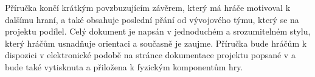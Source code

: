 Příručka končí krátkým povzbuzujícím závěrem, který má hráče motivoval k dalšímu hraní, a také obsahuje poslední přání od vývojového týmu, který se na projektu podílel. Celý dokument je napsán v jednoduchém a srozumitelném stylu, který hráčům usnadňuje orientaci a současně je zaujme. Příručka bude hráčům k dispozici v elektronické podobě na stránce dokumentace projektu popsané v  a bude také vytisknuta a přiložena k fyzickým komponentům hry.


